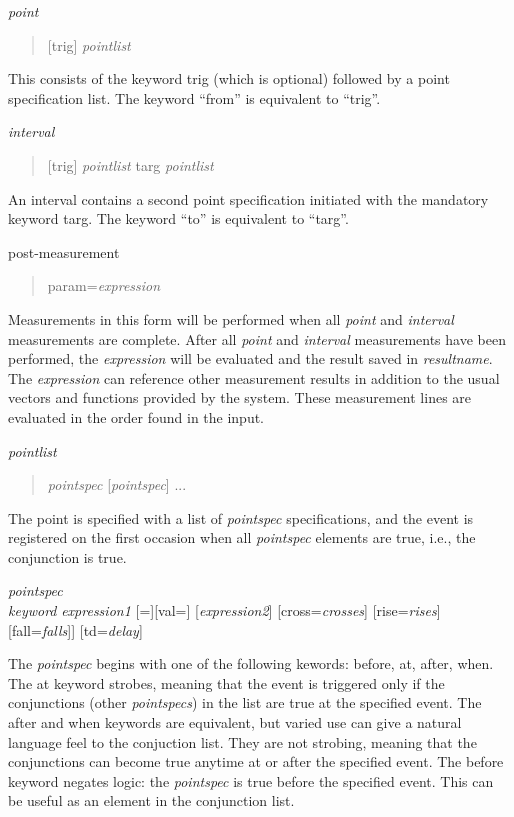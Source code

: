 \begin{description}
\item{\it point}\\
\begin{quote}
[{\vt trig}] {\it pointlist}
\end{quote}
This consists of the keyword {\vt trig} (which is optional) followed
by a point specification list.  The keyword ``{\vt from}'' is
equivalent to ``{\vt trig}''.

\item{\it interval}\\
\begin{quote}
[{\vt trig}] {\it pointlist} {\vt targ} {\it pointlist}
\end{quote}
An interval contains a second point specification initiated with the
mandatory keyword {\vt targ}.  The keyword ``{\vt to}'' is equivalent
to ``{\vt targ}''.

\item{post-measurement}\\
\begin{quote}
{\vt param=}{\it expression}
\end{quote}
Measurements in this form will be performed when all {\it point} and
{\it interval} measurements are complete.  After all {\it point} and
{\it interval} measurements have been performed, the {\it expression}
will be evaluated and the result saved in {\it resultname}.  The {\it
expression} can reference other measurement results in addition to the
usual vectors and functions provided by the system.  These measurement
lines are evaluated in the order found in the input.

\item{\it pointlist}\\
\begin{quote}
{\it pointspec} [{\it pointspec\/}] ...
\end{quote}
The point is specified with a list of {\it pointspec} specifications,
and the event is registered on the first occasion when all {\it
pointspec} elements are true, i.e., the conjunction is true.

\item{\it pointspec}\\
{\it keyword} {\it expression1} [{\vt =}][{\vt val=}] [{\it expression2\/}]
[{\vt cross=}{\it crosses\/}] [{\vt rise=}{\it rises\/}]
[{\vt fall=}{\it falls\/}]] [{\vt td=}{\it delay\/}]
\end{description}

The {\it pointspec} begins with one of the following kewords:  {\vt
before}, {\vt at}, {\vt after}, {\vt when}.  The {\vt at} keyword
strobes, meaning that the event is triggered only if the conjunctions
(other {\it pointspecs}) in the list are true at the specified event. 
The {\vt after} and {\vt when} keywords are equivalent, but varied use
can give a natural language feel to the conjuction list.  They are not
strobing, meaning that the conjunctions can become true anytime at or
after the specified event.  The {\vt before} keyword negates logic: 
the {\it pointspec} is true before the specified event.  This can be
useful as an element in the conjunction list.

